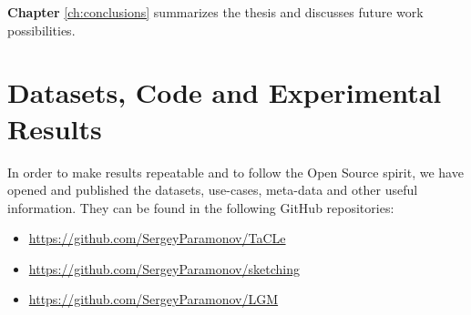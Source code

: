\textbf{Chapter} \ref{ch:conclusions} summarizes the thesis and
discusses future work possibilities.

\section{Datasets, Code and Experimental Results}
In order to make results repeatable and to follow the Open Source
spirit, we have opened and published the datasets, use-cases,
meta-data and other useful information.
They can be found in the following GitHub repositories:
\begin{itemize}
\item \url{https://github.com/SergeyParamonov/TaCLe}
\item \url{https://github.com/SergeyParamonov/sketching}
\item \url{https://github.com/SergeyParamonov/LGM}
\end{itemize}
\cleardoublepage
